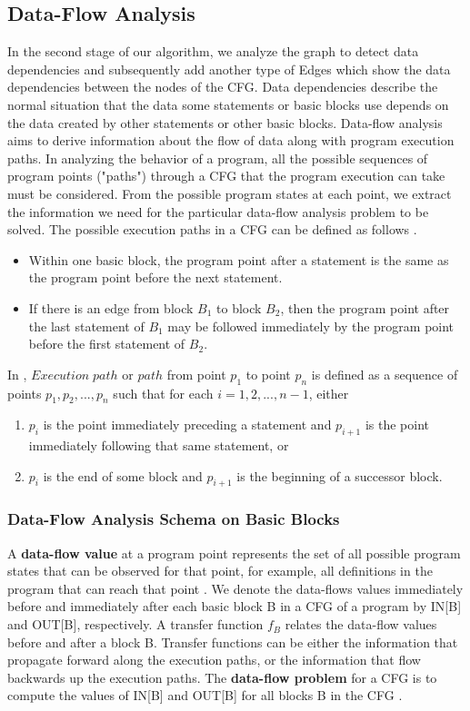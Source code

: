 \subsection{Data-Flow Analysis}
In the second stage of our algorithm, we analyze the graph to detect data dependencies and subsequently add another type of Edges which show the data dependencies between the nodes of the CFG. Data dependencies describe the normal situation that the data some statements or basic blocks use depends on the data created by other statements or other basic blocks. Data-flow analysis aims to derive information about the flow of data along with program execution paths. In analyzing the behavior of a program, all the possible sequences of program points ("paths") through a CFG that the program execution can take must be considered. From the possible program states at each point, we extract the information we need for the particular data-flow analysis problem to be solved. The possible execution paths in a CFG can be defined as follows \cite{lam2006compilers}.
\begin{itemize}
\item Within one basic block, the program point after a statement is the same as the program point before the next statement. 
\item If there is an edge from block $B_{1}$ to block $B_{2}$, then the program point after the last statement of $B_{1}$ may be followed immediately by the program point before the first statement of $B_{2}$. 
\end{itemize}
In \cite{lam2006compilers}, $Execution\;path$ or $path$ from point $p_{1}$ to point $p_{n}$ is defined as a sequence of points $p_{1}, p_{2}, ..., p_{n}$ such that for each $i = 1, 2, ..., n-1$, either 
\begin{enumerate}
\item $p_{i}$ is the point immediately preceding a statement and $p_{i+1}$ is the point immediately following that same statement, or 
\item $p_{i}$ is the end of some block and $p_{i+1}$ is the beginning of a successor block. 
\end{enumerate}

\subsubsection{Data-Flow Analysis Schema on Basic Blocks}
A \textbf{data-flow value} at a program point represents the set of all possible program states that can be observed for that point, for example, all definitions in the program that can reach that point \cite{lam2006compilers}. We denote the data-flows values immediately before and immediately after each basic block B in a CFG of a program by IN[B] and OUT[B], respectively. A transfer function $f_{B}$ relates the data-flow values before and after a block B. Transfer functions can be either the information that propagate forward along the execution paths, or the information that flow backwards up the execution paths. The \textbf{data-flow problem} for a CFG is to compute the values of IN[B] and OUT[B] for all blocks B in the CFG \cite{lam2006compilers}. 

